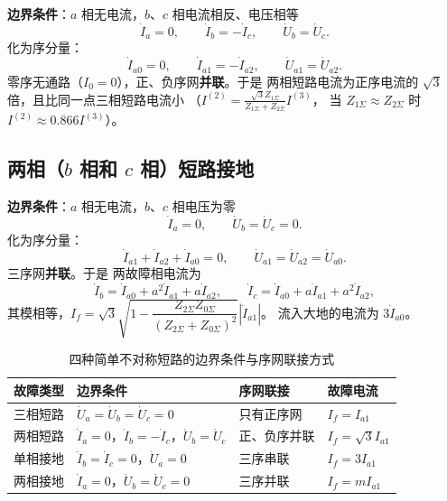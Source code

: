 \textbf{边界条件}：$a$ 相无电流，$b$、$c$ 相电流相反、电压相等
\begin{equation}
  \dot I_a=0,\qquad \dot I_b=-\dot I_c,\qquad \dot U_b=\dot U_c .
\end{equation}
化为序分量：
\begin{equation}
  \dot I_{a0}=0,\qquad \dot I_{a1}=-\dot I_{a2},\qquad \dot U_{a1}=\dot U_{a2}.
\end{equation}
零序无通路（$I_0=0$），正、负序网\textbf{并联}。于是
两相短路电流为正序电流的 $\sqrt{3}$ 倍，且比同一点三相短路电流小
（$I^{(2)}=\frac{\sqrt{3}Z_{1\Sigma}}{Z_{1\Sigma}+Z_{2\Sigma}}I^{(3)}$，
当 $Z_{1\Sigma}\approx Z_{2\Sigma}$ 时 $I^{(2)}\approx0.866I^{(3)}$）。

\subsection{两相（$b$ 相和 $c$ 相）短路接地}

\textbf{边界条件}：$a$ 相无电流，$b$、$c$ 相电压为零
\begin{equation}
  \dot I_a=0,\qquad \dot U_b=\dot U_c=0 .
\end{equation}
化为序分量：
\begin{equation}
  \dot I_{a1}+\dot I_{a2}+\dot I_{a0}=0,\qquad
  \dot U_{a1}=\dot U_{a2}=\dot U_{a0}.
\end{equation}
三序网\textbf{并联}。于是
两故障相电流为
\begin{equation}
  \dot I_b=\dot I_{a0}+a^{2}\dot I_{a1}+a\dot I_{a2},\qquad
  \dot I_c=\dot I_{a0}+a\dot I_{a1}+a^{2}\dot I_{a2},
\end{equation}
其模相等，$I_f=\sqrt{3}\sqrt{1-\dfrac{Z_{2\Sigma}Z_{0\Sigma}}{\left(Z_{2\Sigma}+Z_{0\Sigma}\right)^{2}}}\left|\dot I_{a1}\right|$。
流入大地的电流为 $3\dot I_{a0}$。

\begin{table}[htbp]
  \centering
  \caption{四种简单不对称短路的边界条件与序网联接方式}
  \small
  \begin{tabular}{@{}llll@{}}
    \toprule
    故障类型 & 边界条件 & 序网联接 & 故障电流 \\
    \midrule
    三相短路 & $\dot U_a=\dot U_b=\dot U_c=0$ & 只有正序网 & $I_f=I_{a1}$ \\
    两相短路 & $\dot I_a=0$，$\dot I_b=-\dot I_c$，$\dot U_b=\dot U_c$ & 正、负序并联 & $I_f=\sqrt{3}I_{a1}$ \\
    单相接地 & $\dot I_b=\dot I_c=0$，$\dot U_a=0$ & 三序串联 & $I_f=3I_{a1}$ \\
    两相接地 & $\dot I_a=0$，$\dot U_b=\dot U_c=0$ & 三序并联 & $I_f=mI_{a1}$ \\
    \bottomrule
  \end{tabular}
\end{table}

